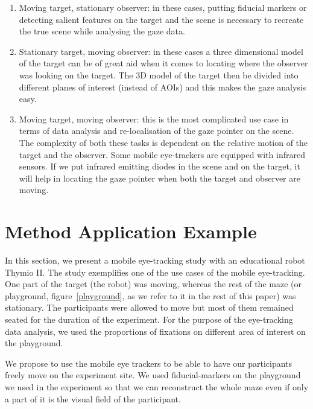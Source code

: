 \documentclass{sig-alternate}
\begin{document}
\begin{enumerate}
\item Moving target, stationary observer: in these cases, putting fiducial markers or detecting salient features on the target and the scene is necessary to recreate the true scene while analysing the gaze data.
\item Stationary target, moving observer: in these cases a three dimensional model of the target can be of great aid when it comes to locating where the observer was looking on the target. The 3D model of the target then be divided into different planes of interest (instead of AOIs) and this makes the gaze analysis easy.
\item Moving target, moving observer: this is the most complicated use case in terms of data analysis and re-localisation of the gaze pointer on the scene. The complexity of both these tasks is dependent on the relative motion of the target and the observer. Some mobile eye-trackers are equipped with infrared sensors. If we put infrared emitting diodes in the scene and on the target, it will help in locating the gaze pointer when both the target and observer are moving.
\end{enumerate}




\section{Method Application Example}
\label{application}

In this section, we present a mobile eye-tracking study with an educational
robot Thymio II. The study exemplifies one of the use cases of the mobile
eye-tracking. One part of the target (the robot) was moving, whereas the rest of
the maze (or playground, figure~\ref{playground}, as we refer to it in the rest
of this paper) was stationary. The participants were allowed to move but most of
them remained seated for the duration of the experiment. For the purpose of the
eye-tracking data analysis, we used the proportions of fixations on different
area of interest on the playground.

We propose to use the mobile eye trackers to be able to have our participants
freely move on the experiment site. We used fiducial-markers
on the playground we used in the experiment so that we can reconstruct the whole maze
even if only a part of it is the visual field of the participant.
\end{document}
